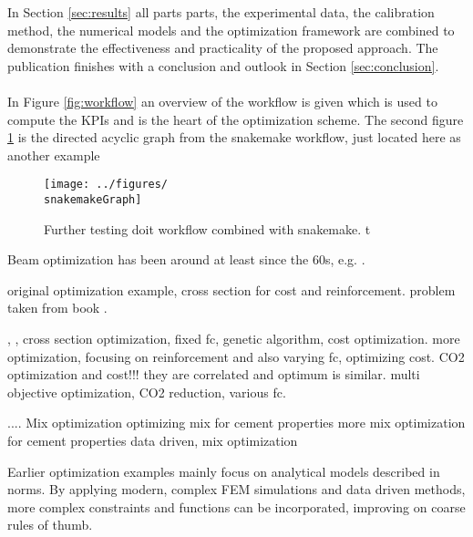 In Section \ref{sec:results} all parts parts, the experimental data, the calibration method, the numerical models and the optimization framework are combined to demonstrate the effectiveness and practicality of the proposed approach.
The publication finishes with a conclusion and outlook in Section \ref{sec:conclusion}.
\\\\
In Figure \ref{fig:workflow} an overview of the workflow is given which is used to compute the KPIs and is the heart of the optimization scheme.
The second figure \ref{fig:snakemake_workflow} is the directed acyclic graph from the snakemake workflow, just located here as another example
\begin{figure}[ht]%
\centering
\texttt{[image: ../figures/\\snakemakeGraph]}
\caption{Further testing doit workflow combined with snakemake. t}\label{fig:snakemake_workflow}
\end{figure}

Beam optimization has been around at least since the 60s, e.g. \cite{Haung1967}.

\cite{Chakrabarty_1992} original optimization example, cross section for cost and reinforcement.
problem taken from book \cite{everard1966reinforced}.

\cite{Coello_1997} , , cross section optimization, fixed fc, genetic algorithm, cost optimization.
\cite{Pierott_2021} more optimization, focusing on reinforcement and also varying fc, optimizing cost.
\cite{Paya_Zaforteza_2009} CO2 optimization and cost!!! they are correlated and optimum is similar.
\cite{dos_Santos_2023} multi objective optimization, CO2 reduction, various fc.

....
Mix optimization
\cite{Lisienkova_2021} optimizing mix for cement properties
\cite{Kondapally_2022} more mix optimization for cement properties
\cite{Shobeiri_2023} data driven, mix optimization



Earlier optimization examples mainly focus on analytical models described in norms.
By applying modern, complex FEM simulations and data driven methods, more complex constraints and functions can be incorporated, improving on coarse rules of thumb.


